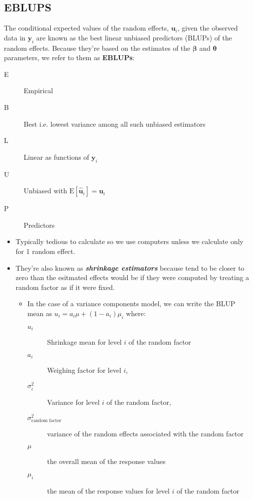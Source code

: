 \documentclass[english]{article}
\begin{document}
\begin{multicols*}{2}
\subsection{EBLUPS}
The conditional expected values of the random effects, $\bm{u}_{i}$, given the observed data in $\bm{y}_{i}$ are known as the best linear unbiased predictors (BLUPs) of the random effects. Because they're based on the estimates of the $\bm{\beta}$ and $\bm{\theta}$ parameters, we refer to them as \textbf{EBLUPs}:
\begin{description}
	\item[E]	Empirical
	\item[B]	Best i.e. lowest variance among all such unbiased estimators
	\item[L]	Linear as functions of $\bm{y}_{i}$
	\item[U]	Unbiased with $\text{E}[\hat{\bm{u}}_{i}] = \bm{u}_{i}$
	\item[P]	Predictors
\end{description}

\begin{itemize}
	\item	Typically tedious to calculate so we use computers unless we calculate only for 1 random effect.
	\item	They're also known as \textbf{\textit{shrinkage estimators}} because tend to be closer to zero than the esitmated effects would be if they were computed by treating a random factor as if it were fixed.
		\begin{itemize}
		\item	In the case of a variance components model, we can write the BLUP mean as $u_{i} = a_{i} \mu + (1 - a_{i}) \mu_{i}$ where:
			\begin{description}
			\item[$u_{i}$]	Shrinkage mean for level $i$ of the random factor
			\item[$a_{i}$]	Weighing factor for level $i$, 
			\item[$\sigma^{2}_{i}$]	Variance for level $i$ of the random factor, 
			\item[$\sigma^{2}_{\text{random factor}}$]	variance of the random effects associated with the random factor 
			\item[$\mu$]	the overall mean of the response values
			\item[$\mu_{i}$]	the mean of the response values for level $i$ of the random factor
			\end{description}
		\end{itemize}
\end{itemize}



\end{multicols*}
\end{document}

